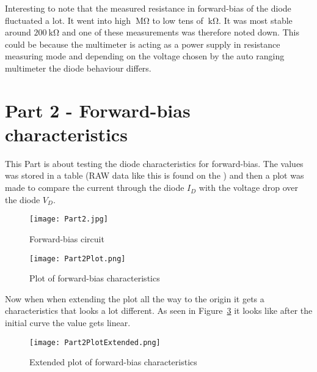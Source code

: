 \documentclass{article}
\begin{document}
Interesting to note that the measured resistance in forward-bias of the diode fluctuated a lot. It went into high \(\SI{}{\mega\ohm}\) to low tens of \(\SI{}{\kilo\ohm}\). It was most stable around \(\SI{200}{\kilo\ohm}\) and one of these measurements was therefore noted down. This could be because the multimeter is acting as a power supply in resistance measuring mode and depending on the voltage chosen by the auto ranging multimeter the diode behaviour differs.


\section{Part 2 - Forward-bias characteristics}
This Part is about testing the diode characteristics for forward-bias. The values was stored in a table (RAW data like this is found on the ) and then a plot was made to compare the current through the diode \(I_D\) with the voltage drop over the diode \(V_D\).

\begin{figure}[h] %
    \centering
    \texttt{[image: Part2.jpg]}
    \caption{Forward-bias circuit}
    \label{fig:Part2}
\end{figure}

\clearpage

\begin{figure}[h] %
    \centering
    \texttt{[image: Part2Plot.png]}
    \caption{Plot of forward-bias characteristics}
    \label{fig:Part2Plot}
\end{figure}

Now when when extending the plot all the way to the origin it gets a characteristics that looks a lot different. As seen in Figure~\ref{fig:Part2PlotExtended} it looks like after the initial curve the value gets linear.

\clearpage

\begin{figure}[h] %
    \centering
    \texttt{[image: Part2PlotExtended.png]}
    \caption{Extended plot of forward-bias characteristics}
    \label{fig:Part2PlotExtended}
\end{figure}
\end{document}
